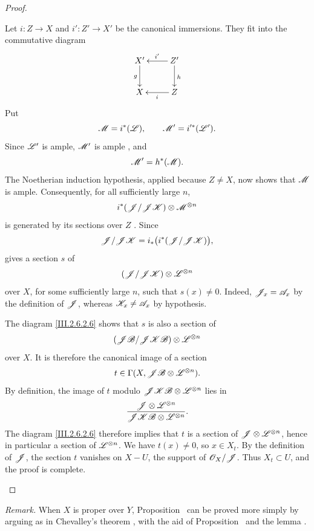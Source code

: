 \begin{proof}
\begin{env}[2.6.2.5]
Let $i:Z\to X$ and $i':Z'\to X'$ be the canonical immersions.
They fit into the commutative diagram
\[
  \xymatrix{
    X'\ar[d]_g &
    Z'\ar[l]_{i'}\ar[d]^h\\
    X &
    Z\ar[l]^{i}
  }
\]
Put
\[
  \mathscr{M}=i^*(\mathscr{L}),
  \qquad
  \mathscr{M}'=i'^*(\mathscr{L}').
\]
Since $\mathscr{L}'$ is ample, $\mathscr{M}'$ is ample
, and
\[
  \mathscr{M}'=h^*(\mathscr{M}).
\]
The Noetherian induction hypothesis, applied because $Z\neq X$, now
shows that $\mathscr{M}$ is ample.
Consequently, for all sufficiently large $n$,
\[
  i^*(\mathscr{J}/\mathscr{J}\mathscr{K})\otimes\mathscr{M}^{\otimes n}
\]
is generated by its sections over $Z$ .
Since
\[
  \mathscr{J}/\mathscr{J}\mathscr{K}
  =
  i_*\bigl(i^*(\mathscr{J}/\mathscr{J}\mathscr{K})\bigr),
\]
 gives a section $s$ of
\[
  (\mathscr{J}/\mathscr{J}\mathscr{K})\otimes\mathscr{L}^{\otimes n}
\]
over $X$, for some sufficiently large $n$, such that $s(x)\neq0$.
Indeed, $\mathscr{J}_x=\mathscr{A}_x$ by the definition of $\mathscr{J}$, whereas
$\mathscr{K}_x\neq\mathscr{A}_x$ by hypothesis.

The diagram \eqref{III.2.6.2.6} shows that $s$ is also a section of
\[
  (\mathscr{J}\mathscr{B}/\mathscr{J}\mathscr{K}\mathscr{B})
  \otimes\mathscr{L}^{\otimes n}
\]
over $X$.
It is therefore the canonical image of a section
\[
  t\in\Gamma(X,\mathscr{J}\mathscr{B}\otimes\mathscr{L}^{\otimes n}).
\]
By definition, the image of $t$ modulo
$\mathscr{J}\mathscr{K}\mathscr{B}\otimes\mathscr{L}^{\otimes n}$ lies in
\[
  \frac{\mathscr{J}\otimes\mathscr{L}^{\otimes n}}
       {\mathscr{J}\mathscr{K}\mathscr{B}\otimes\mathscr{L}^{\otimes n}}.
\]
The diagram \eqref{III.2.6.2.6} therefore implies that $t$ is a section
of $\mathscr{J}\otimes\mathscr{L}^{\otimes n}$, hence in particular a section of
$\mathscr{L}^{\otimes n}$.
We have $t(x)\neq0$, so $x\in X_t$.
By the definition of $\mathscr{J}$, the section $t$ vanishes on $X-U$, the
support of $\mathscr{O}_X/\mathscr{J}$.
Thus $X_t\subset U$, and the proof is complete.
\end{env}
\end{proof}


\begin{env}[2.6.3]
\label{III.2.6.3}
\emph{Remark.}
When $X$ is proper over $Y$, Proposition~ can be proved
more simply by arguing as in Chevalley's theorem
, with the aid of Proposition~ and
the lemma .
\end{env}
